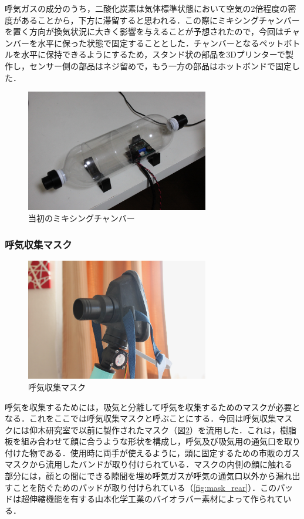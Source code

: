 呼気ガスの成分のうち，二酸化炭素は気体標準状態において空気の2倍程度の密度があることから，下方に滞留すると思われる．この際にミキシングチャンバーを置く方向が換気状況に大きく影響を与えることが予想されたので，今回はチャンバーを水平に保った状態で固定することとした．チャンバーとなるペットボトルを水平に保持できるようにするため，スタンド状の部品を3Dプリンターで製作し，センサー側の部品はネジ留めで，もう一方の部品はホットボンドで固定した．

\begin{figure}[H]
  \begin{center}
    \includegraphics[width=8cm]{fig/mixing_chamber_early}
    \caption{当初のミキシングチャンバー}
    \label{fig:mixing_chamber_early}
  \end{center}
\end{figure}

\subsubsection{呼気収集マスク}

\begin{figure}[H]
  \begin{center}
    \includegraphics[width=8cm]{fig/mask_front}
    \caption{呼気収集マスク}
    \label{fig:mask_front}
  \end{center}
\end{figure}

呼気を収集するためには，吸気と分離して呼気を収集するためのマスクが必要となる．これをここでは呼気収集マスクと呼ぶことにする．今回は呼気収集マスクには仰木研究室で以前に製作された\cite{mask_build}マスク（図\ref{fig:mask_front}）を流用した．これは，樹脂板を組み合わせて顔に合うような形状を構成し，呼気及び吸気用の通気口を取り付けた物である．使用時に両手が使えるように，頭に固定するための市販のガスマスクから流用したバンドが取り付けられている．マスクの内側の顔に触れる部分には，顔との間にできる隙間を埋め呼気ガスが呼気の通気口以外から漏れ出すことを防ぐためのパッドが取り付けられている（\ref{fig:mask_rear}）．このパッドは超伸縮機能を有する山本化学工業のバイオラバー素材によって作られている．

